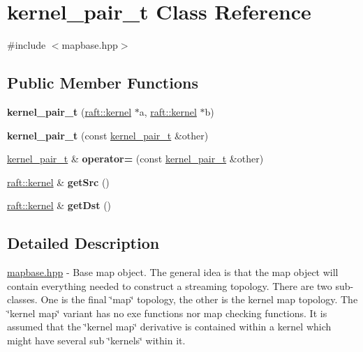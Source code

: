 \hypertarget{classkernel__pair__t}{}\section{kernel\+\_\+pair\+\_\+t Class Reference}
\label{classkernel__pair__t}


{\ttfamily \#include $<$mapbase.\+hpp$>$}

\subsection*{Public Member Functions}
\begin{DoxyCompactItemize}
\item 
\hypertarget{classkernel__pair__t_a59979573ae296da0e0b0699217cb2a42}{}{\bfseries kernel\+\_\+pair\+\_\+t} (\hyperlink{classraft_1_1kernel}{raft\+::kernel} $\ast$a, \hyperlink{classraft_1_1kernel}{raft\+::kernel} $\ast$b)\label{classkernel__pair__t_a59979573ae296da0e0b0699217cb2a42}

\item 
\hypertarget{classkernel__pair__t_a47e946fc0253e9f01259235c0bb9d381}{}{\bfseries kernel\+\_\+pair\+\_\+t} (const \hyperlink{classkernel__pair__t}{kernel\+\_\+pair\+\_\+t} \&other)\label{classkernel__pair__t_a47e946fc0253e9f01259235c0bb9d381}

\item 
\hypertarget{classkernel__pair__t_aa27ca016b843be27113e1ba29b5681aa}{}\hyperlink{classkernel__pair__t}{kernel\+\_\+pair\+\_\+t} \& {\bfseries operator=} (const \hyperlink{classkernel__pair__t}{kernel\+\_\+pair\+\_\+t} \&other)\label{classkernel__pair__t_aa27ca016b843be27113e1ba29b5681aa}

\item 
\hypertarget{classkernel__pair__t_a9a8d84cee112617162c10fa36b2f417f}{}\hyperlink{classraft_1_1kernel}{raft\+::kernel} \& {\bfseries get\+Src} ()\label{classkernel__pair__t_a9a8d84cee112617162c10fa36b2f417f}

\item 
\hypertarget{classkernel__pair__t_aa8a4f1e082a2ea3178c35821b0cc4bbf}{}\hyperlink{classraft_1_1kernel}{raft\+::kernel} \& {\bfseries get\+Dst} ()\label{classkernel__pair__t_aa8a4f1e082a2ea3178c35821b0cc4bbf}

\end{DoxyCompactItemize}


\subsection{Detailed Description}
\hyperlink{mapbase_8hpp_source}{mapbase.\+hpp} -\/ Base map object. The general idea is that the map object will contain everything needed to construct a streaming topology. There are two sub-\/classes. One is the final \char`\"{}map\char`\"{} topology, the other is the kernel map topology. The \char`\"{}kernel map\char`\"{} variant has no exe functions nor map checking functions. It is assumed that the \char`\"{}kernel map\char`\"{} derivative is contained within a kernel which might have several sub \char`\"{}kernels\char`\"{} within it.

